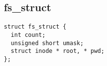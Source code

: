 \subsection*{fs\_struct}
\begin{tscreen}\begin{verbatim}
struct fs_struct {
  int count;
  unsigned short umask;
  struct inode * root, * pwd;
};
\end{verbatim}\end{tscreen}

